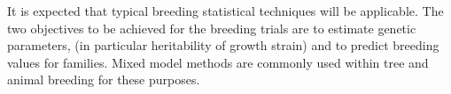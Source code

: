 It
is expected that typical breeding statistical techniques will be applicable. The
two objectives to be achieved for the breeding trials are to estimate genetic
parameters, (in particular heritability of growth strain) and to predict
breeding values for families. Mixed model methods are commonly used within tree
and animal breeding for these purposes.